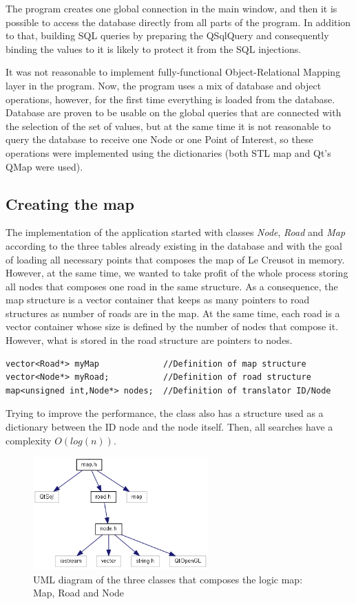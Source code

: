 \documentclass{article}
\begin{document}
The program creates one global connection in the main window, and then it is possible to access the database directly from all parts of the program. In addition to that, building SQL queries by preparing the QSqlQuery and consequently binding the values to it is likely to protect it from the SQL injections.

It was not reasonable to implement fully-functional Object-Relational Mapping layer in the program. Now, the program uses a mix of database and object operations, however, for the first time everything is loaded from the database. Database are proven to be usable on the global queries that are connected with the selection of the set of values, but at the same time it is not reasonable to query the database to receive one Node or one Point of Interest, so these operations were implemented using the dictionaries (both STL map and Qt's QMap were used).

\subsection{Creating the map}
The implementation of the application started with classes \textit{Node}, \textit{Road} and \textit{Map} according to the three tables already existing in the database and with the goal of loading all necessary points that composes the map of Le Creusot in memory. However, at the same time, we wanted to take profit of the whole process storing all nodes that composes one road in the same structure. As a consequence, the map structure is a vector container that keeps as many pointers to road structures as number of roads are in the map. At the same time, each road is a vector container whose size is defined by the number of nodes that compose it. However, what is stored in the road structure are pointers to nodes.

\begin{lstlisting}
vector<Road*> myMap 			//Definition of map structure
vector<Node*> myRoad;			//Definition of road structure
map<unsigned int,Node*> nodes;	//Definition of translator ID/Node
\end{lstlisting}

Trying to improve the performance, the class also has a structure used as a dictionary between the ID node and the node itself. Then, all searches have a complexity $ O(log(n)) $.

\begin{figure}[h]
\centering
\includegraphics[width=0.6\textwidth]{map.png}
\caption{UML diagram of the three classes that composes the logic map: Map, Road and Node}
\end{figure}
\end{document}
